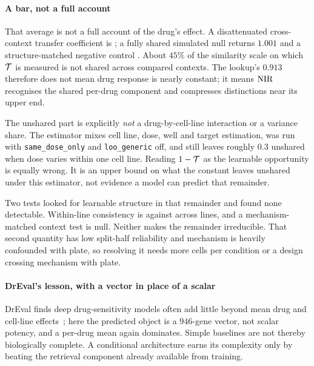 \paragraph{A bar, not a full account} That average is not a full account of the
drug's effect. A disattenuated cross-context transfer coefficient is
; a fully shared simulated null returns $1.001$
and a structure-matched negative control . About
$45\%$ of the similarity scale on which $\mathcal{T}$ is measured is not shared across
compared contexts. The lookup's $0.913$ therefore does not mean drug response is
nearly constant; it means $\textrm{NIR}$ recognises the shared per-drug component and
compresses distinctions near its upper end.

\begin{scopelimit}
The unshared part is explicitly \emph{not} a drug-by-cell-line interaction or a
variance share. The estimator mixes cell line, dose, well and target estimation,
was run with \texttt{same\_dose\_only} and \texttt{loo\_generic} off, and still
leaves roughly $0.3$ unshared when dose varies within one cell line. Reading
$1-\mathcal{T}$ as the learnable opportunity is equally wrong. It is an upper bound on
what the constant leaves unshared under this estimator, not evidence a model can
predict that remainder.
\end{scopelimit}

Two tests looked for learnable structure in that remainder and found none
detectable. Within-line consistency is  against
 across lines, and a mechanism-matched context test
is null. Neither makes the remainder irreducible. That second quantity has low
split-half reliability and mechanism is heavily confounded with plate, so
resolving it needs more cells per condition or a design crossing mechanism with
plate.

\paragraph{DrEval's lesson, with a vector in place of a scalar} DrEval finds deep
drug-sensitivity models often add little beyond mean drug and cell-line
effects~\cite{dreval}; here the predicted object is a $946$-gene vector, not
scalar potency, and a per-drug mean again dominates. Simple baselines are not
thereby biologically complete. A conditional architecture earns its complexity
only by beating the retrieval component already available from training.

